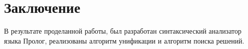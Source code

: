 \chapter{Заключение}
В результате проделанной работы, был разработан синтаксический анализатор языка Пролог, реализованы алгоритм унификации и алгоритм поиска решений.